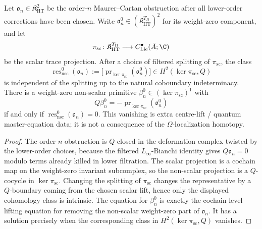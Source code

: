 \begin{lem}\label{lem:nonscalar-weight-zero-vanishing}
Let \(\mathfrak o_n\in\mathfrak K_{\mathrm{HT}}^2\) be the
order-\(n\) Maurer--Cartan obstruction after all lower-order corrections
have been chosen.  Write
\(\mathfrak o_n^0\in(\mathfrak K_{\mathrm{HT}}^{T_\Omega})^2\) for its
weight-zero component, and let
\[
  \pi_{\mathrm{sc}}\colon
  \mathfrak K_{\mathrm{HT}}^{T_\Omega}
  \longrightarrow C^\bullet_{\mathrm{Lie}}(\bar A;\C)
\]
be the scalar trace projection.  After a choice of filtered splitting of
\(\pi_{\mathrm{sc}}\), the class
\[
  \operatorname{res}^{0}_{\mathrm{nsc}}(\mathfrak o_n)
  :=
  \bigl[\operatorname{pr}_{\ker\pi_{\mathrm{sc}}}(\mathfrak o_n^0)\bigr]
  \in H^2(\ker\pi_{\mathrm{sc}},Q)
\]
is independent of the splitting up to the natural coboundary
indeterminacy.  There is a weight-zero non-scalar primitive
\(\beta_n^0\in(\ker\pi_{\mathrm{sc}})^1\) with
\[
  Q\beta_n^0
  =
  -\operatorname{pr}_{\ker\pi_{\mathrm{sc}}}(\mathfrak o_n^0)
\]
if and only if
\(\operatorname{res}^{0}_{\mathrm{nsc}}(\mathfrak o_n)=0\).  This
vanishing is extra centre-lift / quantum master-equation data; it is not
a consequence of the \(\Omega\)-localization homotopy.
\end{lem}

\begin{proof}
The order-\(n\) obstruction is \(Q\)-closed in the deformation complex
twisted by the lower-order choices, because the filtered
\(L_\infty\)-Bianchi identity gives
\(Q\mathfrak o_n=0\) modulo terms already killed in lower filtration.
The scalar projection is a cochain map on the weight-zero invariant
subcomplex, so the non-scalar projection is a \(Q\)-cocycle in
\(\ker\pi_{\mathrm{sc}}\).  Changing the splitting of
\(\pi_{\mathrm{sc}}\) changes the representative by a \(Q\)-boundary
coming from the chosen scalar lift, hence only the displayed cohomology
class is intrinsic.  The equation for \(\beta_n^0\) is exactly the
cochain-level lifting equation for removing the non-scalar weight-zero
part of \(\mathfrak o_n\).  It has a solution precisely when the
corresponding class in \(H^2(\ker\pi_{\mathrm{sc}},Q)\) vanishes.
\end{proof}

